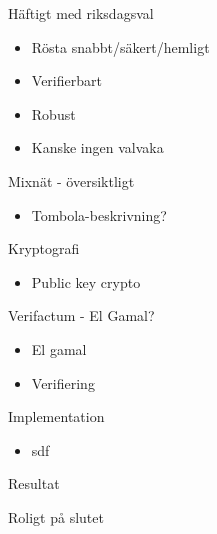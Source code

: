 \documentclass{beamer}
\begin{document}
\begin{frame}{Häftigt med riksdagsval}

\begin{itemize}
\item Rösta snabbt/säkert/hemligt
\item Verifierbart
\item Robust
\item Kanske ingen valvaka
\end{itemize}

\end{frame}

\begin{frame}{Mixnät - översiktligt}

\begin{itemize}
\item Tombola-beskrivning?
\end{itemize}

\end{frame}

\begin{frame}{Kryptografi}

\begin{itemize}
\item Public key crypto
\end{itemize}

\end{frame}

\begin{frame}{Verifactum - El Gamal?}

\begin{itemize}
\item El gamal
\item Verifiering
\end{itemize}

\end{frame}

\begin{frame}{Implementation}

\begin{itemize}
\item sdf
\end{itemize}

\end{frame}

\begin{frame}{Resultat}

\end{frame}

\begin{frame}{Roligt på slutet}

\end{frame}
\end{document}
